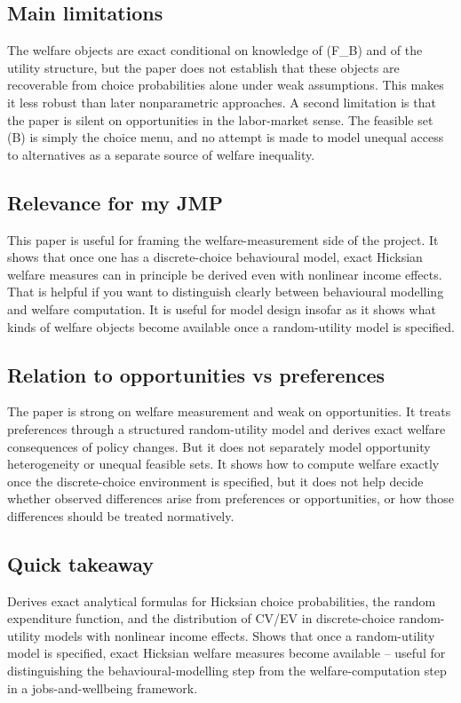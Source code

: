 \documentclass[11pt,a4paper]{article}
\begin{document}
\subsection*{Main limitations}
The welfare objects are exact conditional on knowledge of (F\_B) and of the utility structure, but the paper does not establish that these objects are recoverable from choice probabilities alone under weak assumptions. This makes it less robust than later nonparametric approaches. A second limitation is that the paper is silent on opportunities in the labor-market sense. The feasible set (B) is simply the choice menu, and no attempt is made to model unequal access to alternatives as a separate source of welfare inequality.

\subsection*{Relevance for my JMP}
This paper is useful for framing the welfare-measurement side of the project. It shows that once one has a discrete-choice behavioural model, exact Hicksian welfare measures can in principle be derived even with nonlinear income effects. That is helpful if you want to distinguish clearly between behavioural modelling and welfare computation. It is useful for model design insofar as it shows what kinds of welfare objects become available once a random-utility model is specified.

\subsection*{Relation to opportunities vs preferences}
The paper is strong on welfare measurement and weak on opportunities. It treats preferences through a structured random-utility model and derives exact welfare consequences of policy changes. But it does not separately model opportunity heterogeneity or unequal feasible sets. It shows how to compute welfare exactly once the discrete-choice environment is specified, but it does not help decide whether observed differences arise from preferences or opportunities, or how those differences should be treated normatively.

\subsection*{Quick takeaway}
Derives exact analytical formulas for Hicksian choice probabilities, the random expenditure function, and the distribution of CV/EV in discrete-choice random-utility models with nonlinear income effects. Shows that once a random-utility model is specified, exact Hicksian welfare measures become available -- useful for distinguishing the behavioural-modelling step from the welfare-computation step in a jobs-and-wellbeing framework.
\end{document}
